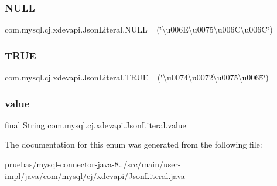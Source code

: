 \subsubsection{\texorpdfstring{N\+U\+LL}{NULL}}
{\footnotesize\ttfamily com.\+mysql.\+cj.\+xdevapi.\+Json\+Literal.\+N\+U\+LL =(\char`\"{}\textbackslash{}u006\+E\textbackslash{}u0075\textbackslash{}u006\+C\textbackslash{}u006C\char`\"{})}

\mbox{\label{enumcom_1_1mysql_1_1cj_1_1xdevapi_1_1_json_literal_a722be7500d3b4eaca0cff79a1d09b547}} 
\subsubsection{\texorpdfstring{T\+R\+UE}{TRUE}}
{\footnotesize\ttfamily com.\+mysql.\+cj.\+xdevapi.\+Json\+Literal.\+T\+R\+UE =(\char`\"{}\textbackslash{}u0074\textbackslash{}u0072\textbackslash{}u0075\textbackslash{}u0065\char`\"{})}

\mbox{\label{enumcom_1_1mysql_1_1cj_1_1xdevapi_1_1_json_literal_a4faaa8c9c53810006badb212c2187575}} 
\subsubsection{\texorpdfstring{value}{value}}
{\footnotesize\ttfamily final String com.\+mysql.\+cj.\+xdevapi.\+Json\+Literal.\+value}



The documentation for this enum was generated from the following file\+:\begin{DoxyCompactItemize}
\item 
pruebas/mysql-\/connector-\/java-\/8../src/main/user-\/impl/java/com/mysql/cj/xdevapi/\mbox{\hyperlink{_json_literal_8java}{Json\+Literal.\+java}}\end{DoxyCompactItemize}
